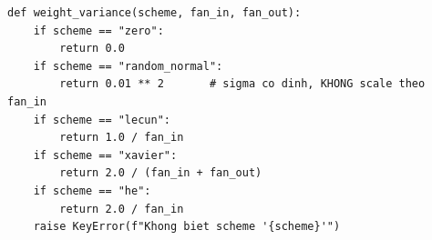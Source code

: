 \documentclass[12pt,a4paper]{report}
\begin{document}
\begin{lstlisting}[caption={Cong thuc Var(W) cho tung scheme -- src/initialization.py (nguyên văn Bảng~\ref{tab:schemes})}]
def weight_variance(scheme, fan_in, fan_out):
    if scheme == "zero":
        return 0.0
    if scheme == "random_normal":
        return 0.01 ** 2       # sigma co dinh, KHONG scale theo fan_in
    if scheme == "lecun":
        return 1.0 / fan_in
    if scheme == "xavier":
        return 2.0 / (fan_in + fan_out)
    if scheme == "he":
        return 2.0 / fan_in
    raise KeyError(f"Khong biet scheme '{scheme}'")
\end{lstlisting}
\end{document}
